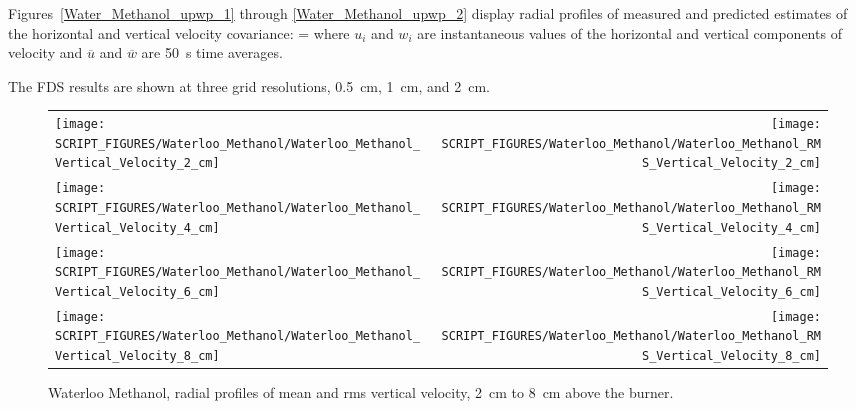 Figures~\ref{Water_Methanol_upwp_1} through \ref{Water_Methanol_upwp_2} display radial profiles of measured and predicted estimates of the horizontal and vertical velocity covariance:
\be
    = 
\ee
where $u_i$ and $w_i$ are instantaneous values of the horizontal and vertical components of velocity and $\overline{u}$ and $\overline{w}$ are 50~s time averages.

The FDS results are shown at three grid resolutions, 0.5~cm, 1~cm, and 2~cm.



\begin{figure}[p]
\begin{tabular*}{\textwidth}{l@{\extracolsep{\fill}}r}
\texttt{[image: SCRIPT\_FIGURES/Waterloo\_Methanol/Waterloo\_Methanol\_Vertical\_Velocity\_2\_cm]} &
\texttt{[image: SCRIPT\_FIGURES/Waterloo\_Methanol/Waterloo\_Methanol\_RMS\_Vertical\_Velocity\_2\_cm]} \\
\texttt{[image: SCRIPT\_FIGURES/Waterloo\_Methanol/Waterloo\_Methanol\_Vertical\_Velocity\_4\_cm]} &
\texttt{[image: SCRIPT\_FIGURES/Waterloo\_Methanol/Waterloo\_Methanol\_RMS\_Vertical\_Velocity\_4\_cm]} \\
\texttt{[image: SCRIPT\_FIGURES/Waterloo\_Methanol/Waterloo\_Methanol\_Vertical\_Velocity\_6\_cm]} &
\texttt{[image: SCRIPT\_FIGURES/Waterloo\_Methanol/Waterloo\_Methanol\_RMS\_Vertical\_Velocity\_6\_cm]} \\
\texttt{[image: SCRIPT\_FIGURES/Waterloo\_Methanol/Waterloo\_Methanol\_Vertical\_Velocity\_8\_cm]} &
\texttt{[image: SCRIPT\_FIGURES/Waterloo\_Methanol/Waterloo\_Methanol\_RMS\_Vertical\_Velocity\_8\_cm]}
\end{tabular*}
\caption[Waterloo Methanol, radial mean and rms vertical velocity, 2~cm to 8~cm above burner]
{Waterloo Methanol, radial profiles of mean and rms vertical velocity, 2~cm to 8~cm above the burner.}
\label{Water_Methanol_Vert_Vel_1}
\end{figure}

